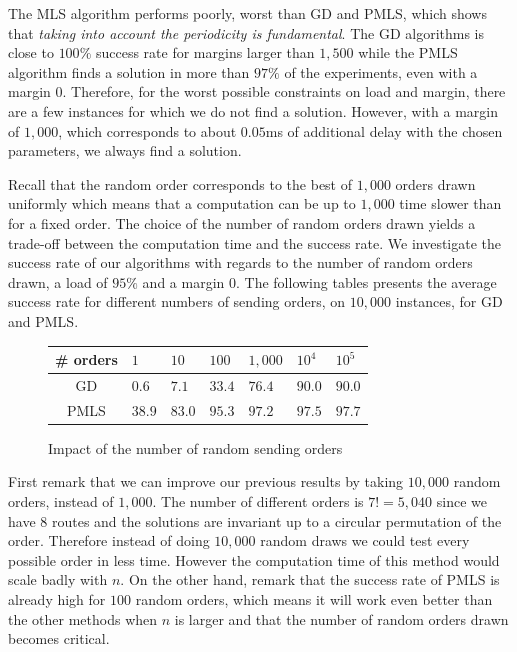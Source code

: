 \documentclass[10pt, conference, letterpaper]{IEEEtran}
\begin{document}
     The MLS algorithm performs poorly, worst than GD and PMLS, which shows that \emph{taking into account the periodicity is fundamental}.
     The GD algorithms is close to $100\%$ success rate for margins larger than $1,500$ while the PMLS algorithm finds a solution in more than $97\%$ of the experiments, even with a margin $0$. Therefore, for the worst possible constraints on load and margin, there are a few instances for which we do not find a solution. However, with a margin of $1,000$, which corresponds to about $0.05$ms of additional delay with the chosen parameters, we always find a solution. 
     
    Recall that the random order corresponds to the best of $1,000$ orders drawn uniformly which means that a computation can be up to $1,000$ time slower than for a fixed order. The choice of the number of random orders drawn yields a trade-off between the computation time and the success rate. We investigate the success rate of our algorithms with regards to the number of random orders drawn, a load of $95\%$ and a margin $0$. The following tables presents the average success rate for different numbers of sending orders, on $10,000$ instances, for GD and PMLS.
         \begin{figure}[h] 
       \begin{center}
   \begin{tabularx}{0.5\textwidth}{|c|X|X|X|X|X|X|}
    \hline
    \# orders& $1$ & $10$ & $100$& $1,000$& $10^{4}$&$10^{5}$\\
    \hline
    GD & $0.6$ &$7.1$&$33.4$&$76.4$&$90.0$&$90.0$\\
    \hline
  PMLS & $38.9$ &$83.0$&$95.3$&$97.2$&$97.5$&$97.7$\\
    \hline
      \end{tabularx}
      \end{center}
   \caption{Impact of the number of random sending orders}
     \end{figure}

First remark that we can improve our previous results by taking $10,000$ random orders,
instead of $1,000$. The number of different orders is $7!= 5,040$ since we have $8$ routes and the solutions are invariant up to a circular permutation of the order. Therefore instead of doing $10,000$ random draws we could test every possible order in less time. However the computation time of this method would scale badly with $n$. On the other hand, remark that the success rate of PMLS is already high for $100$ random orders, which means it will work even better than the other methods when $n$ is larger and that the number of random orders drawn becomes critical.
     
\end{document}
